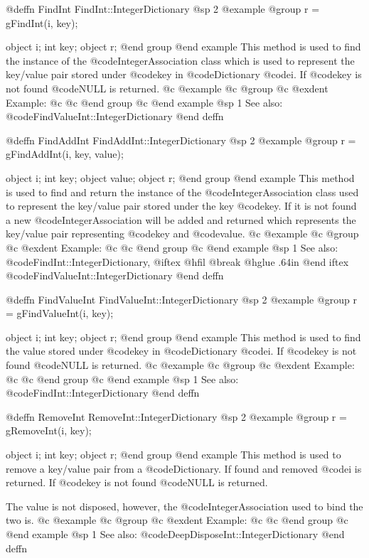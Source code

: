 @deffn {FindInt} FindInt::IntegerDictionary
@sp 2
@example
@group
r = gFindInt(i, key);

object  i;
int     key;
object  r;
@end group
@end example
This method is used to find the instance of the @code{IntegerAssociation}
class which is used to represent the key/value pair stored under
@code{key} in @code{Dictionary} @code{i}.  If @code{key} is not found
@code{NULL} is returned.
@c @example
@c @group
@c @exdent Example:
@c 
@c @end group
@c @end example
@sp 1
See also:  @code{FindValueInt::IntegerDictionary}
@end deffn










@deffn {FindAddInt} FindAddInt::IntegerDictionary
@sp 2
@example
@group
r = gFindAddInt(i, key, value);

object  i;
int     key;
object  value;
object  r;
@end group
@end example
This method is used to find and return the instance of the
@code{IntegerAssociation} class used to represent the key/value pair
stored under the key @code{key}.  If it is not found a new
@code{IntegerAssociation} will be added and returned which represents the
key/value pair representing @code{key} and @code{value}.
@c @example
@c @group
@c @exdent Example:
@c 
@c @end group
@c @end example
@sp 1
See also:  @code{FindInt::IntegerDictionary,}
@iftex
@hfil @break @hglue .64in      
@end iftex
@code{FindValueInt::IntegerDictionary}
@end deffn









@deffn {FindValueInt} FindValueInt::IntegerDictionary
@sp 2
@example
@group
r = gFindValueInt(i, key);

object  i;
int     key;
object  r;
@end group
@end example
This method is used to find the value stored under @code{key} in
@code{Dictionary} @code{i}.  If @code{key} is not found @code{NULL} is
returned.
@c @example
@c @group
@c @exdent Example:
@c 
@c @end group
@c @end example
@sp 1
See also:  @code{FindInt::IntegerDictionary}
@end deffn











@deffn {RemoveInt} RemoveInt::IntegerDictionary
@sp 2
@example
@group
r = gRemoveInt(i, key);

object  i;
int     key;
object  r;
@end group
@end example
This method is used to remove a key/value pair from a @code{Dictionary}.
If found and removed @code{i} is returned.  If @code{key} is not found
@code{NULL} is returned.

The value is not disposed, however, the @code{IntegerAssociation} used to
bind the two is.
@c @example
@c @group
@c @exdent Example:
@c 
@c @end group
@c @end example
@sp 1
See also:  @code{DeepDisposeInt::IntegerDictionary}
@end deffn





